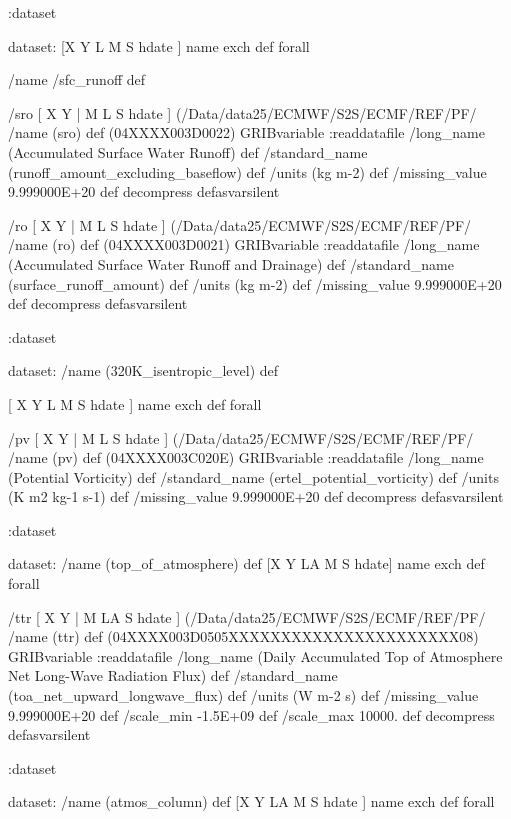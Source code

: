 \begin{ingrid}
{:dataset

dataset:
[X Y L M S hdate ] {name exch def } forall

/name /sfc_runoff def

/sro { [ X Y | M L S hdate ] (/Data/data25/ECMWF/S2S/ECMF/REF/PF/%
/name (sro) def
(04XXXX003D0022) GRIBvariable
:readdatafile
/long_name (Accumulated Surface Water Runoff) def
/standard_name (runoff_amount_excluding_baseflow) def
/units (kg m-2) def
/missing_value 9.999000E+20 def
decompress
} defasvarsilent

/ro { [ X Y | M L S hdate ] (/Data/data25/ECMWF/S2S/ECMF/REF/PF/%
/name (ro) def
(04XXXX003D0021) GRIBvariable
:readdatafile
/long_name (Accumulated Surface Water Runoff and Drainage) def
/standard_name (surface_runoff_amount) def
/units (kg m-2) def
/missing_value 9.999000E+20 def
decompress
} defasvarsilent

:dataset

dataset:
/name (320K_isentropic_level) def

[ X Y L M S hdate ] { name exch def } forall

/pv { [ X Y | M L S hdate ] (/Data/data25/ECMWF/S2S/ECMF/REF/PF/%
/name (pv) def
(04XXXX003C020E) GRIBvariable
:readdatafile
/long_name (Potential Vorticity) def
/standard_name (ertel_potential_vorticity) def
/units (K m2 kg-1 s-1) def
/missing_value 9.999000E+20 def
decompress
} defasvarsilent

:dataset

dataset:
/name (top_of_atmosphere) def
[X Y LA M S hdate] {name exch def } forall

/ttr { [ X Y | M LA S hdate ] (/Data/data25/ECMWF/S2S/ECMF/REF/PF/%
/name (ttr) def
(04XXXX003D0505XXXXXXXXXXXXXXXXXXXXXX08) GRIBvariable
:readdatafile
/long_name (Daily Accumulated Top of Atmosphere Net Long-Wave Radiation Flux) def
/standard_name (toa_net_upward_longwave_flux) def
/units (W m-2 s) def
/missing_value 9.999000E+20 def
/scale_min -1.5E+09 def
/scale_max 10000. def
decompress
} defasvarsilent

:dataset

dataset:
/name (atmos_column) def
[X Y LA M S hdate ] {name exch def } forall

}
\end{ingrid}
